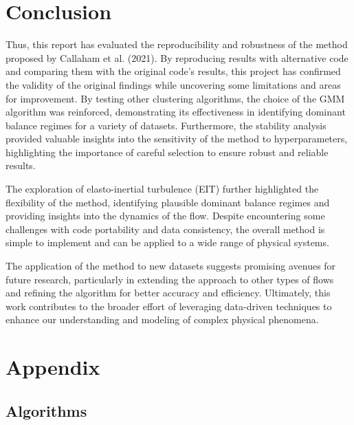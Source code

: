 \documentclass[12pt]{report} %
\begin{document}
\chapter{Conclusion}

Thus, this report has evaluated the reproducibility and robustness of the method proposed by Callaham et al. (2021). By reproducing results with alternative code and comparing them with the original code's results, this project has confirmed the validity of the original findings while uncovering some limitations and areas for improvement. By testing other clustering algorithms, the choice of the GMM algorithm was reinforced, demonstrating its effectiveness in identifying dominant balance regimes for a variety of datasets. Furthermore, the stability analysis provided valuable insights into the sensitivity of the method to hyperparameters, highlighting the importance of careful selection to ensure robust and reliable results.

The exploration of elasto-inertial turbulence (EIT) further highlighted the flexibility of the method, identifying plausible dominant balance regimes and providing insights into the dynamics of the flow. Despite encountering some challenges with code portability and data consistency, the overall method is simple to implement and can be applied to a wide range of physical systems.

The application of the method to new datasets suggests promising avenues for future research, particularly in extending the approach to other types of flows and refining the algorithm for better accuracy and efficiency. Ultimately, this work contributes to the broader effort of leveraging data-driven techniques to enhance our understanding and modeling of complex physical phenomena.


\chapter{Appendix}

\section{Algorithms}
\end{document}
